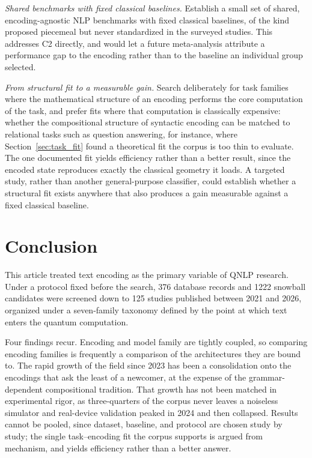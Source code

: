 \documentclass{ieeeaccess}
\begin{document}
\emph{Shared benchmarks with fixed classical baselines.} Establish a small set of shared, encoding-agnostic NLP benchmarks with fixed classical baselines, of the kind proposed piecemeal but never standardized in the surveyed studies. This addresses C2 directly, and would let a future meta-analysis attribute a performance gap to the encoding rather than to the baseline an individual group selected.

\emph{From structural fit to a measurable gain.} Search deliberately for task families where the mathematical structure of an encoding performs the core computation of the task, and prefer fits where that computation is classically expensive: whether the compositional structure of syntactic encoding can be matched to relational tasks such as question answering, for instance, where Section~\ref{sec:task_fit} found a theoretical fit the corpus is too thin to evaluate. The one documented fit yields efficiency rather than a better result, since the encoded state reproduces exactly the classical geometry it loads. A targeted study, rather than another general-purpose classifier, could establish whether a structural fit exists anywhere that also produces a gain measurable against a fixed classical baseline.

\section{Conclusion}
\label{sec:conclusion}

This article treated text encoding as the primary variable of QNLP research. Under a protocol fixed before the search, 376 database records and 1222 snowball candidates were screened down to 125 studies published between 2021 and 2026, organized under a seven-family taxonomy defined by the point at which text enters the quantum computation.

Four findings recur. Encoding and model family are tightly coupled, so comparing encoding families is frequently a comparison of the architectures they are bound to. The rapid growth of the field since 2023 has been a consolidation onto the encodings that ask the least of a newcomer, at the expense of the grammar-dependent compositional tradition. That growth has not been matched in experimental rigor, as three-quarters of the corpus never leaves a noiseless simulator and real-device validation peaked in 2024 and then collapsed. Results cannot be pooled, since dataset, baseline, and protocol are chosen study by study; the single task--encoding fit the corpus supports is argued from mechanism, and yields efficiency rather than a better answer.
\end{document}
